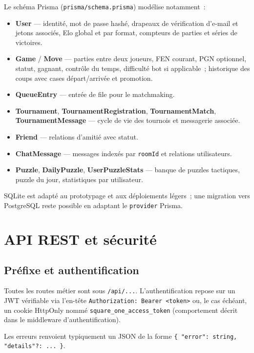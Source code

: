 \documentclass[11pt,a4paper]{report}
\begin{document}
Le schéma Prisma (\texttt{prisma/schema.prisma}) modélise notamment~:

\begin{itemize}[leftmargin=*]
  \item \textbf{User} — identité, mot de passe hashé, drapeaux de vérification d'e-mail et jetons associés, Elo global et par format, compteurs de parties et séries de victoires.
  \item \textbf{Game} / \textbf{Move} — parties entre deux joueurs, FEN courant, PGN optionnel, statut, gagnant, contrôle du temps, difficulté bot si applicable~; historique des coups avec cases départ/arrivée et promotion.
  \item \textbf{QueueEntry} — entrée de file pour le matchmaking.
  \item \textbf{Tournament}, \textbf{TournamentRegistration}, \textbf{TournamentMatch}, \textbf{TournamentMessage} — cycle de vie des tournois et messagerie associée.
  \item \textbf{Friend} — relations d'amitié avec statut.
  \item \textbf{ChatMessage} — messages indexés par \texttt{roomId} et relations utilisateurs.
  \item \textbf{Puzzle}, \textbf{DailyPuzzle}, \textbf{UserPuzzleStats} — banque de puzzles tactiques, puzzle du jour, statistiques par utilisateur.
\end{itemize}

SQLite est adapté au prototypage et aux déploiements légers~; une migration vers PostgreSQL reste possible en adaptant le \texttt{provider} Prisma.

\chapter{API REST et sécurité}

\section{Préfixe et authentification}

Toutes les routes métier sont sous \texttt{/api/...}. L'authentification repose sur un JWT vérifiable via l'en-tête \texttt{Authorization: Bearer <token>} ou, le cas échéant, un cookie HttpOnly nommé \texttt{square\_one\_access\_token} (comportement décrit dans le middleware d'authentification).

Les erreurs renvoient typiquement un JSON de la forme \texttt{\{ "error": string, "details"?: ... \}}.
\end{document}
